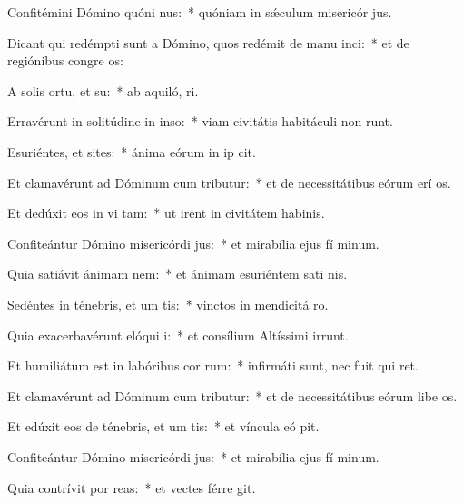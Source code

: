 \item Confitémini Dómino quóni nus:~* quóniam in sǽculum misericór jus.
\item Dicant qui redémpti sunt a Dómino, quos redémit de manu inci:~* et de regiónibus congre os:
\item A solis ortu, et su:~* ab aquiló,  ri.
\item Erravérunt in solitúdine in inso:~* viam civitátis habitáculi non runt.
\item Esuriéntes, et sites:~* ánima eórum in ip cit.
\item Et clamavérunt ad Dóminum cum tributur:~* et de necessitátibus eórum erí os.
\item Et dedúxit eos in vi tam:~* ut irent in civitátem habinis.
\item Confiteántur Dómino misericórdi jus:~* et mirabília ejus fí minum.
\item Quia satiávit ánimam nem:~* et ánimam esuriéntem sati nis.
\item Sedéntes in ténebris, et um tis:~* vinctos in mendicitá  ro.
\item Quia exacerbavérunt elóqui i:~* et consílium Altíssimi irrunt.
\item Et humiliátum est in labóribus cor rum:~* infirmáti sunt, nec fuit qui ret.
\item Et clamavérunt ad Dóminum cum tributur:~* et de necessitátibus eórum libe os.
\item Et edúxit eos de ténebris, et um tis:~* et víncula eó pit.
\item Confiteántur Dómino misericórdi jus:~* et mirabília ejus fí minum.
\item Quia contrívit por reas:~* et vectes férre git.
